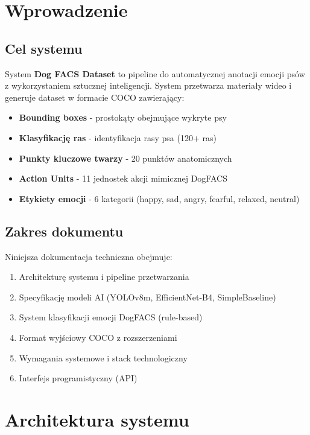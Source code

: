 \documentclass[12pt,a4paper]{article}
\begin{document}
\section{Wprowadzenie}

\subsection{Cel systemu}

System \textbf{Dog FACS Dataset} to pipeline do automatycznej anotacji emocji psów z wykorzystaniem sztucznej inteligencji. System przetwarza materiały wideo i generuje dataset w formacie COCO zawierający:

\begin{itemize}
    \item \textbf{Bounding boxes} - prostokąty obejmujące wykryte psy
    \item \textbf{Klasyfikację ras} - identyfikacja rasy psa (120+ ras)
    \item \textbf{Punkty kluczowe twarzy} - 20 punktów anatomicznych
    \item \textbf{Action Units} - 11 jednostek akcji mimicznej DogFACS
    \item \textbf{Etykiety emocji} - 6 kategorii (happy, sad, angry, fearful, relaxed, neutral)
\end{itemize}

\subsection{Zakres dokumentu}

Niniejsza dokumentacja techniczna obejmuje:
\begin{enumerate}
    \item Architekturę systemu i pipeline przetwarzania
    \item Specyfikację modeli AI (YOLOv8m, EfficientNet-B4, SimpleBaseline)
    \item System klasyfikacji emocji DogFACS (rule-based)
    \item Format wyjściowy COCO z rozszerzeniami
    \item Wymagania systemowe i stack technologiczny
    \item Interfejs programistyczny (API)
\end{enumerate}

\section{Architektura systemu}
\end{document}

